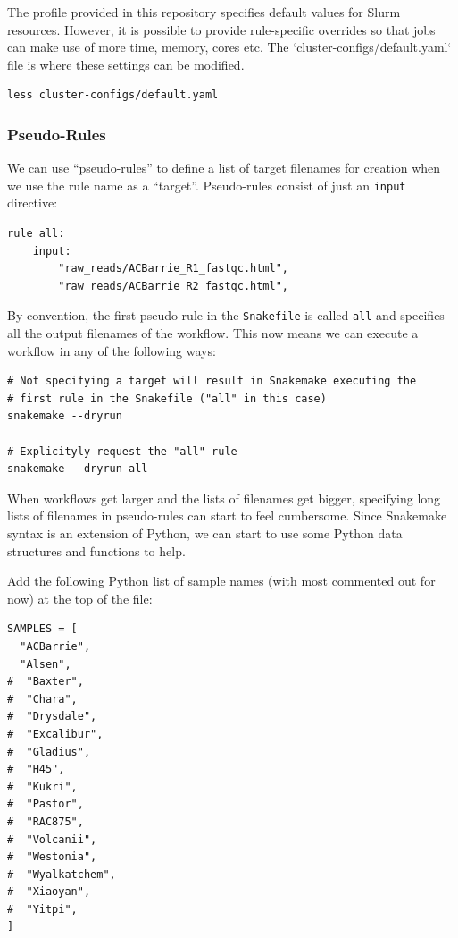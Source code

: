 The profile provided in this repository specifies default values for Slurm resources. However, it is possible to provide
rule-specific overrides so that jobs can make use of more time, memory, cores etc. The `cluster-configs/default.yaml` file is where
these settings can be modified.

\begin{lstlisting}
less cluster-configs/default.yaml
\end{lstlisting}

\subsubsection{Pseudo-Rules}

We can use ``pseudo-rules'' to define a list of target filenames for creation when we use the rule name as a ``target''. Pseudo-rules consist of just an \texttt{input} directive:

\begin{lstlisting}
rule all:
	input:
		"raw_reads/ACBarrie_R1_fastqc.html",
		"raw_reads/ACBarrie_R2_fastqc.html",
\end{lstlisting}

By convention, the first pseudo-rule in the \texttt{Snakefile} is called \texttt{all} and specifies all the output filenames of the workflow. This now
means we can execute a workflow in any of the following ways:

\begin{lstlisting}
# Not specifying a target will result in Snakemake executing the
# first rule in the Snakefile ("all" in this case)
snakemake --dryrun

# Explicityly request the "all" rule
snakemake --dryrun all
\end{lstlisting}

When workflows get larger and the lists of filenames get bigger, specifying long lists of filenames in pseudo-rules can start to feel cumbersome.
Since Snakemake syntax is an extension of Python, we can start to use some Python data structures and functions to help.

Add the following Python list of sample names (with most commented out for now) at the top of the file:

\begin{lstlisting}
SAMPLES = [
  "ACBarrie",
  "Alsen",
#  "Baxter",
#  "Chara",
#  "Drysdale",
#  "Excalibur",
#  "Gladius",
#  "H45",
#  "Kukri",
#  "Pastor",
#  "RAC875",
#  "Volcanii",
#  "Westonia",
#  "Wyalkatchem",
#  "Xiaoyan",
#  "Yitpi",
]
\end{lstlisting}

